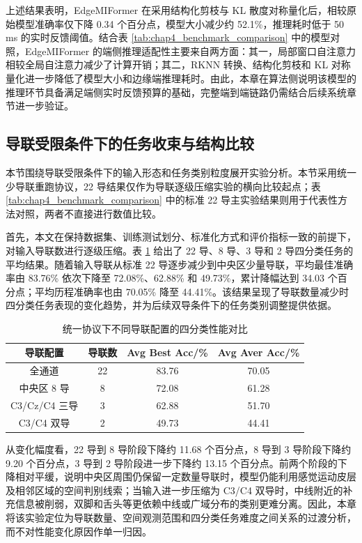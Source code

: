 上述结果表明，EdgeMIFormer 在采用结构化剪枝与 KL 散度对称量化后，相较原始模型准确率仅下降 0.34 个百分点，模型大小减少约 52.1\%，推理耗时低于 50 ms 的实时反馈阈值。结合表 \ref{tab:chap4_benchmark_comparison} 中的模型对照，EdgeMIFormer 的端侧推理适配性主要来自两方面：其一，局部窗口自注意力相较全局自注意力减少了计算开销；其二，RKNN 转换、结构化剪枝和 KL 对称量化进一步降低了模型大小和边缘端推理耗时。由此，本章在算法侧说明该模型的推理环节具备满足端侧实时反馈预算的基础，完整端到端链路仍需结合后续系统章节进一步验证。

\subsection{导联受限条件下的任务收束与结构比较}
本节围绕导联受限条件下的输入形态和任务类别粒度展开实验分析。本节采用统一少导联重跑协议，22 导结果仅作为导联逐级压缩实验的横向比较起点；表 \ref{tab:chap4_benchmark_comparison} 中的标准 22 导主实验结果则用于代表性方法对照，两者不直接进行数值比较。

首先，本文在保持数据集、训练测试划分、标准化方式和评价指标一致的前提下，对输入导联数进行逐级压缩。表 \ref{tab:channel_degradation} 给出了 22 导、8 导、3 导和 2 导四分类任务的平均结果。随着输入导联从标准 22 导逐步减少到中央区少量导联，平均最佳准确率由 83.76\% 依次下降至 72.08\%、62.88\% 和 49.73\%，累计降幅达到 34.03 个百分点；平均历程准确率也由 70.05\% 降至 44.41\%。该结果呈现了导联数量减少时四分类任务表现的变化趋势，并为后续双导条件下的任务类别调整提供依据。

\begin{table}[htbp]
    \centering
    \caption{统一协议下不同导联配置的四分类性能对比}
    \label{tab:channel_degradation}
    \begin{tabular}{cccc}
        \hline
        导联配置 & 导联数 & Avg Best Acc/\% & Avg Aver Acc/\% \\
        \hline
        全通道 & 22 & 83.76 & 70.05 \\
        中央区 8 导 & 8 & 72.08 & 61.28 \\
        C3/Cz/C4 三导 & 3 & 62.88 & 51.70 \\
        C3/C4 双导 & 2 & 49.73 & 44.41 \\
        \hline
    \end{tabular}
\end{table}

从变化幅度看，22 导到 8 导阶段下降约 11.68 个百分点，8 导到 3 导阶段下降约 9.20 个百分点，3 导到 2 导阶段进一步下降约 13.15 个百分点。前两个阶段的下降相对平缓，说明中央区周围仍保留一定数量导联时，模型仍能利用感觉运动皮层及相邻区域的空间判别线索；当输入进一步压缩为 C3/C4 双导时，中线附近的补充信息被削弱，双脚和舌头等更依赖中线或广域分布的类别更难分离。因此，本章将该实验定位为导联数量、空间观测范围和四分类任务难度之间关系的过渡分析，而不对性能变化原因作单一归因。

